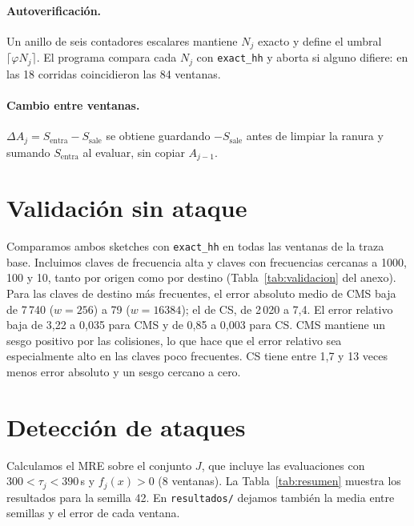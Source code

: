 \documentclass[11pt]{article}
\newcommand{\code}[1]{\texttt{#1}}
\begin{document}
\paragraph{Autoverificación.} Un anillo de seis contadores escalares mantiene $N_j$ exacto y define el umbral $\lceil\varphi N_j\rceil$. El programa compara cada $N_j$ con \code{exact\_hh} y aborta si alguno difiere: en las 18 corridas coincidieron las 84 ventanas.

\paragraph{Cambio entre ventanas.} $\Delta A_j=S_{\text{entra}}-S_{\text{sale}}$ se obtiene guardando $-S_{\text{sale}}$ antes de limpiar la ranura y sumando $S_{\text{entra}}$ al evaluar, sin copiar $A_{j-1}$.

\section{Validación sin ataque}

Comparamos ambos sketches con \code{exact\_hh} en todas las ventanas de la traza base. Incluimos claves de frecuencia alta y claves con frecuencias cercanas a 1000, 100 y 10, tanto por origen como por destino (Tabla~\ref{tab:validacion} del anexo). Para las claves de destino más frecuentes, el error absoluto medio de CMS baja de 7\,740 ($w=256$) a 79 ($w=16384$); el de CS, de 2\,020 a 7,4. El error relativo baja de 3,22 a 0,035 para CMS y de 0,85 a 0,003 para CS. CMS mantiene un sesgo positivo por las colisiones, lo que hace que el error relativo sea especialmente alto en las claves poco frecuentes. CS tiene entre 1,7 y 13 veces menos error absoluto y un sesgo cercano a cero.

\section{Detección de ataques}

Calculamos el MRE sobre el conjunto $J$, que incluye las evaluaciones con $300<\tau_j<390$\,s y $f_j(x)>0$ (8 ventanas). La Tabla~\ref{tab:resumen} muestra los resultados para la semilla 42. En \code{resultados/} dejamos también la media entre semillas y el error de cada ventana.
\end{document}
